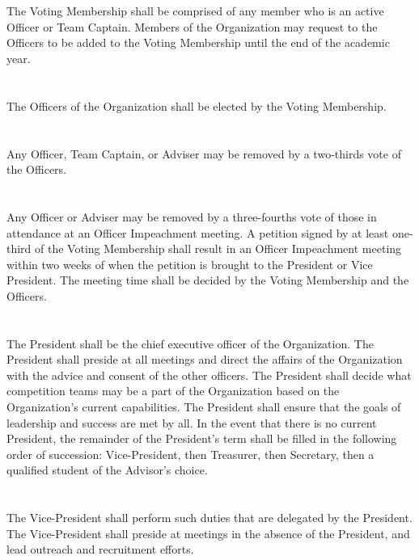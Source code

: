 \documentclass[12pt]{cls/constitution}
\begin{document}
\section{}
The Voting Membership shall be comprised of any member who is an active Officer or Team Captain. Members of the Organization may request to the Officers to be added to the Voting Membership until the end of the academic year.

\section{}
The Officers of the Organization shall be elected by the Voting Membership.

\section{}
Any Officer, Team Captain, or Adviser may be removed by a two-thirds vote of the Officers.

\section{}
Any Officer or Adviser may be removed by a three-fourths vote of those in attendance at an Officer Impeachment meeting. A petition signed by at least one-third of the Voting Membership shall result in an Officer Impeachment meeting within two weeks of when the petition is brought to the President or Vice President. The meeting time shall be decided by the Voting Membership and the Officers.

\section{}
The President shall be the chief executive officer of the Organization. The President shall preside at all meetings and direct the affairs of the Organization with the advice and consent of the other officers. The President shall decide what competition teams may be a part of the Organization based on the Organization’s current capabilities. The President shall ensure that the goals of leadership and success are met by all. In the event that there is no current President, the remainder of the President’s term shall be filled in the following order of succession:  Vice-President, then Treasurer, then Secretary, then a qualified student of the Advisor’s choice.

\section{}
The Vice-President shall perform such duties that are delegated by the President. The Vice-President shall preside at meetings in the absence of the President, and lead outreach and recruitment efforts. 
\end{document}
